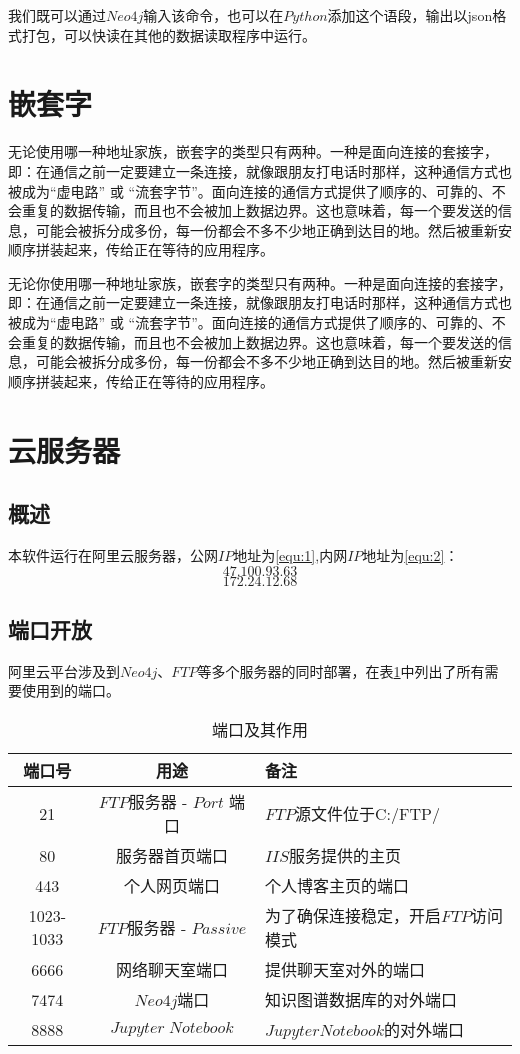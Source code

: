 \documentclass[forprint]{OSPaper}
\begin{document}
我们既可以通过$Neo4j$输入该命令，也可以在$Python$添加这个语段，输出以json格式打包，可以快读在其他的数据读取程序中运行。

\section{嵌套字}
无论使用哪一种地址家族，嵌套字的类型只有两种。一种是面向连接的套接字，即：在通信之前一定要建立一条连接，就像跟朋友打电话时那样，这种通信方式也被成为“虚电路” 或 “流套字节”。面向连接的通信方式提供了顺序的、可靠的、不会重复的数据传输，而且也不会被加上数据边界。这也意味着，每一个要发送的信息，可能会被拆分成多份，每一份都会不多不少地正确到达目的地。然后被重新安顺序拼装起来，传给正在等待的应用程序。

无论你使用哪一种地址家族，嵌套字的类型只有两种。一种是面向连接的套接字，即：在通信之前一定要建立一条连接，就像跟朋友打电话时那样，这种通信方式也被成为“虚电路” 或 “流套字节”。面向连接的通信方式提供了顺序的、可靠的、不会重复的数据传输，而且也不会被加上数据边界。这也意味着，每一个要发送的信息，可能会被拆分成多份，每一份都会不多不少地正确到达目的地。然后被重新安顺序拼装起来，传给正在等待的应用程序。
\section{云服务器}
\subsection{概述}
本软件运行在阿里云服务器，公网$IP$地址为\ref{equ:1},内网$IP$地址为\ref{equ:2}：
\begin{equation}
	\label{equ:1}
	47.100.93.63
\end{equation}
\begin{equation}
	\label{equ:2}
	172.24.12.68
\end{equation}

\subsection{端口开放}
阿里云平台涉及到$Neo4j$、$FTP$等多个服务器的同时部署，在表\ref{table:4}中列出了所有需要使用到的端口。

\begin{table}[ht]
	\caption{端口及其作用}
	\label{table:4}
	\begin{tabular}{ccl}
		\hline
		端口号 & 用途     & 备注                         \\ \hline
		21  & $FTP$服务器 - $Port$ 端口   & $FTP$源文件位于C:/FTP/   \\
		80   & 服务器首页端口   & $IIS$服务提供的主页  \\
		443   & 个人网页端口   & 个人博客主页的端口  \\
		1023-1033   & $FTP$服务器 - $Passive$& 为了确保连接稳定，开启$FTP$访问模式  \\
		6666   & 网络聊天室端口   & 提供聊天室对外的端口  \\
		7474   & $Neo4j$端口 & 知识图谱数据库的对外端口        \\
		8888   & $Jupyter \; Notebook$   & $Jupyter Notebook$的对外端口 \\ \hline
	\end{tabular}
\end{table}
\end{document}
